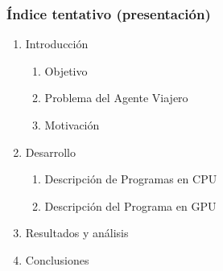 \documentclass{article}
\begin{document}
\begin{titlepage}
\begin{centering}
\begin{minipage}{3in}
\begin{center}
            \subsubsection*{Índice tentativo (presentación)}
            {\footnotesize
            \begin{enumerate}
                \item Introducción
                    \begin{enumerate}[label=\roman* ]
                        \item Objetivo
                        \item Problema del Agente Viajero
                        \item Motivación
                    \end{enumerate}
                \item Desarrollo
                    \begin{enumerate}[label=\roman* ]
                        \item Descripción de Programas en CPU
                        \item Descripción del Programa en GPU
                    \end{enumerate}
                \item Resultados y análisis
                \item Conclusiones
            \end{enumerate}
            }
            \end{center}
        \end{minipage}
        
        \vspace{1cm}
        \vfill
    \end{centering}
    \printbibliography
    \end{titlepage}

    \pagestyle{logotipos}
\end{document}
